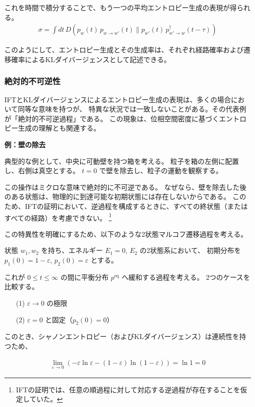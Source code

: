 \documentclass[a4paper,11pt]{jsarticle}
\numberwithin{equation}{section}
\begin{document}
これを時間で積分することで、もう一つの平均エントロピー生成の表現が得られる。
\begin{align}
\sigma = \int dt\, D(p_w(t)\, p_{w \to w'}(t) \| p_{w'}(t)\, p^{\dagger}_{w' \to w}(t - \tau))
\end{align}

このようにして、エントロピー生成とその生成率は、それぞれ経路確率および遷移確率によるKLダイバージェンスとして記述できる。

\subsubsection{絶対的不可逆性}

IFTとKLダイバージェンスによるエントロピー生成の表現は、多くの場合において同等な意味を持つが、
特異な状況では一致しないことがある。その代表例が「絶対的不可逆過程」である。
この現象は、位相空間密度に基づくエントロピー生成の理解とも関連する。

\textbf{例：壁の除去}

典型的な例として、中央に可動壁を持つ箱を考える。
粒子を箱の左側に配置し、右側は真空とする。
$t = 0$ で壁を除去し、粒子の運動を観察する。

この操作はミクロな意味で絶対的に不可逆である。
なぜなら、壁を除去した後のある状態は、物理的に到達可能な初期状態には存在しないからである。
このため、IFTの証明において、逆過程を構成するときに、すべての終状態（またはすべての経路）を考慮できない。
\footnote{IFTの証明では、任意の順過程に対して対応する逆過程が存在することを仮定していた。}


この特異性を明確にするため、以下のような2状態マルコフ遷移過程を考える。

状態 $w_1, w_2$ を持ち、エネルギー $E_1 = 0$, $E_2$ の2状態系において、
初期分布を $p_1(0) = 1 - \varepsilon$, $p_2(0) = \varepsilon$ とする。

これが $0 \leq t \leq \infty$ の間に平衡分布 $p^{\mathrm{eq}}$ へ緩和する過程を考える。
2つのケースを比較する。

\begin{itemize}
  \item[(1)] $\varepsilon \to 0$ の極限
  \item[(2)] $\varepsilon = 0$ と固定（$p_2(0) = 0$）
\end{itemize}

このとき、シャノンエントロピー（およびKLダイバージェンス）は連続性を持つため、

\begin{align}
\lim_{\varepsilon \to 0} \left( - \varepsilon \ln \varepsilon - (1 - \varepsilon) \ln (1 - \varepsilon) \right)
= \ln 1 = 0
\end{align}
\end{document}
